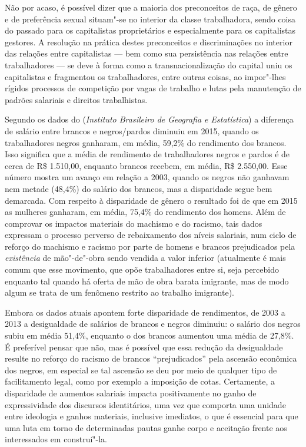 Não por acaso, é possível dizer que a maioria dos preconceitos de raça,
de gênero e de preferência sexual situam"-se no interior da classe
trabalhadora, sendo coisa do passado para os capitalistas proprietários
e especialmente para os capitalistas gestores. A resolução na prática
destes preconceitos e discriminações no interior das relações entre
capitalistas --- bem como sua persistência nas relações entre
trabalhadores --- se deve à forma como a transnacionalização do capital
uniu os capitalistas e fragmentou os trabalhadores, entre outras coisas,
ao impor"-lhes rígidos processos de competição por vagas de trabalho e
lutas pela manutenção de padrões salariais e direitos trabalhistas.

Segundo os dados do \emph{} (\emph{Instituto Brasileiro de Geografia
e Estatística}) a diferença de salário entre brancos e negros/pardos
diminuiu em 2015, quando os trabalhadores negros ganharam, em média,
59,2\% do rendimento dos brancos. Isso significa que a média de
rendimento de trabalhadores negros e pardos é de cerca de R\$ 1.510,00,
enquanto brancos recebem, em média, R\$ 2.550,00. Esse número mostra um
avanço em relação a 2003, quando os negros não ganhavam nem metade
(48,4\%) do salário dos brancos, mas a disparidade segue bem demarcada.
Com respeito à disparidade de gênero o resultado foi de que em 2015 as
mulheres ganharam, em média, 75,4\% do rendimento dos homens. Além de
comprovar os impactos materiais do machismo e do racismo, tais dados
expressam o processo perverso de rebaixamento dos níveis salariais, num
ciclo de reforço do machismo e racismo por parte de homens e brancos
prejudicados pela \emph{existência} de mão"-de"-obra sendo vendida a valor
inferior (atualmente é mais comum que esse movimento, que opõe
trabalhadores entre si, seja percebido enquanto tal quando há oferta de
mão de obra barata imigrante, mas de modo algum se trata de um fenômeno
restrito ao trabalho imigrante).

Embora os dados atuais apontem forte disparidade de rendimentos, de 2003
a 2013 a desigualdade de salários de brancos e negros diminuiu: o
salário dos negros subiu em média 51,4\%, enquanto o dos brancos
aumentou uma média de 27,8\%. É preferível pensar que não, mas é
possível que essa redução da desigualdade resulte no reforço do racismo
de brancos ``prejudicados'' pela ascensão econômica dos negros, em
especial se tal ascensão se deu por meio de qualquer tipo de
facilitamento legal, como por exemplo a imposição de cotas. Certamente,
a disparidade de aumentos salariais impacta positivamente no ganho de
expressividade dos discursos identitários, uma vez que comporta uma
unidade entre ideologia e ganhos materiais, inclusive imediatos, o que é
essencial para que uma luta em torno de determinadas pautas ganhe corpo
e aceitação frente aos interessados em construí"-la.


